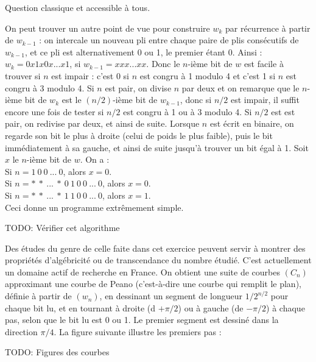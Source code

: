 

\Q
Question classique et accessible à tous.



\Q
On peut trouver un autre point de vue pour construire $w_k$ par récurrence à partir de $w_{k-1}$ : on intercale un nouveau pli entre chaque paire de plis consécutifs de $w_{k-1}$, et ce pli est alternativement 0 ou 1, le premier étant 0. Ainsi : $w_k=0x1x0x...x1$, si $w_{k-1}=xxx...xx$. Donc le $n$-ième bit de $w$ est facile à trouver si $n$ est impair : c'est 0 si $n$ est congru à 1 modulo 4 et c'est 1 si $n$ est congru à 3 modulo 4. Si $n$ est pair, on divise $n$ par deux et on remarque que le $n$-ième bit de $w_k$ est le $(n/2)$-ième bit de $w_{k-1}$, donc si $n/2$ est impair, il suffit encore une fois de tester si $n/2$ est congru à 1 ou à 3 modulo 4. Si $n/2$ est est pair, on redivise par deux, et ainsi de suite. Lorsque $n$ est écrit en binaire, on regarde son bit le plus à droite (celui de poids le plus faible), puis le bit immédiatement à sa gauche, et ainsi de suite jusqu'à trouver un bit égal à 1. Soit $x$ le $n$-ième bit de $w$. On a :\\
Si $n=1~0~0~...~0$, alors $x=0$.\\
Si $n=*~*~...~*~0~1~0~0~...~0$, alors $x=0$.\\
Si $n=*~*~...~*~1~1~0~0~...~0$, alors $x=1$.\\
Ceci donne un programme extrêmement simple.

TODO: Vérifier cet algorithme

\medskip

Des études du genre de celle faite dans cet exercice peuvent servir à montrer des propriétés d'algébricité ou de transcendance du nombre étudié. C'est actuellement un domaine actif de recherche en France. On obtient une suite de courbes $(C_n)$ approximant une courbe de Peano (c'est-à-dire une courbe qui remplit le plan), définie à partir de $(w_n)$, en dessinant un segment de longueur $1/2^{n/2}$ pour chaque bit lu, et en tournant à droite (d $+\pi/2$) ou à gauche (de $-\pi/2$) à chaque pas, selon que le bit lu est 0 ou 1. Le premier segment est dessiné dans la direction $\pi/4$. La figure suivante illustre les premiers pas :

TODO: Figures des courbes

\Fin
